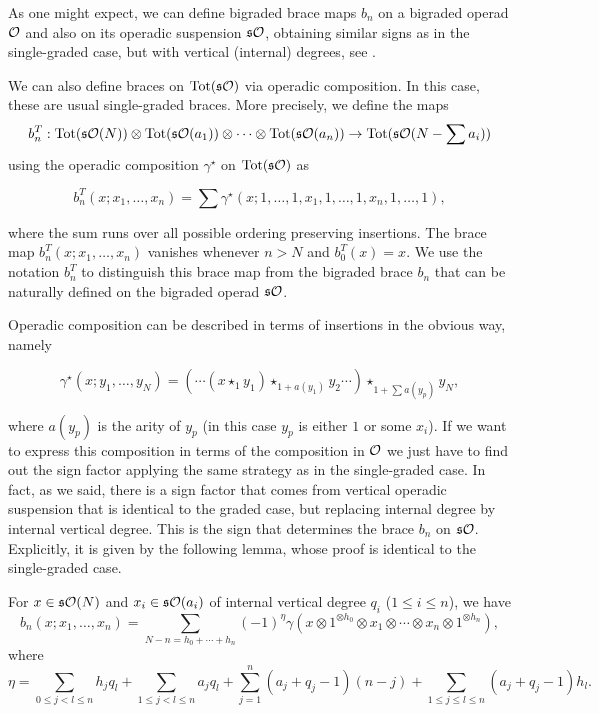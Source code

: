 \documentclass[Thesis.tex]{subfiles}
\begin{document}
As one might expect, we can define bigraded brace maps $b_n$ on a bigraded operad ${\mathcal O}$ and also on its operadic suspension $\mathfrak{s}{\mathcal O}$, obtaining similar signs as in the single-graded case, but with vertical (internal) degrees, see . 

We can also define braces on $\operatorname{Tot}(\mathfrak{s}{\mathcal O})$ via operadic composition. In this case, these are usual single-graded braces. More precisely, we define the maps 
\[b^T_n:\operatorname{Tot}(\mathfrak{s}{\mathcal O}(N))\otimes \operatorname{Tot}(\mathfrak{s}{\mathcal O}(a_1))\otimes\cdots\otimes \operatorname{Tot}(\mathfrak{s}{\mathcal O}(a_n))\to \operatorname{Tot}(\mathfrak{s}{\mathcal O}(N-\sum a_i))\]
using the operadic composition $\gamma^\star$ on $\operatorname{Tot}(\mathfrak{s}{\mathcal O})$ as

\[b^T_n(x;x_1,\dots,x_n)=\sum\gamma^\star(x;1,\dots,1,x_1,1,\dots,1,x_n,1,\dots,1),\]

where the sum runs over all possible ordering preserving insertions. The brace map $b^T_n(x;x_1,\dots,x_n)$ vanishes whenever $n>N$ and $b^T_0(x)=x$. We use the notation $b^T_n$ to distinguish this brace map from the bigraded brace $b_n$ that can be naturally defined on the bigraded operad $\mathfrak{s}{\mathcal O}$.

Operadic composition can be described in terms of insertions in the obvious way, namely 

\begin{equation}\label{gammastar}
\gamma^\star(x;y_1,\dots,y_N)=(\cdots(x\star_1 y_1)\star_{1+a(y_1)}y_2\cdots)\star_{1+\sum a(y_p)}y_N,
\end{equation}

where $a(y_p)$ is the arity of $y_p$ (in this case $y_p$ is either $1$ or some $x_i$). If we want to express this composition in terms of the composition in ${\mathcal O}$ we just have to find out the sign factor applying the same strategy as in the single-graded case. In fact, as we said, there is a sign factor that comes from vertical operadic suspension that is identical to the graded case, but replacing internal degree by internal vertical degree. This is the sign that determines the brace $b_n$ on $\mathfrak{s}{\mathcal O}$. Explicitly, it is given by the following lemma, whose proof is identical to the single-graded case.


 
 \begin{lem}\label{bigradedsign}
For $x\in \mathfrak{s}{\mathcal O}(N)$ and $x_i\in\mathfrak{s}{\mathcal O}(a_i)$ of internal vertical degree $q_i$ ($1\leq i\leq n$), we have
\[b_n(x;x_1,\dots,x_n)=\sum_{N-n=h_0+\cdots+h_n} (-1)^\eta \gamma
(x\otimes 1^{\otimes h_0}\otimes x_1\otimes \cdots\otimes x_n\otimes1^{\otimes h_n}),\]
where 
\[\eta=\sum_{0\leq j<l\leq n}h_jq_l+\sum_{1\leq j<l\leq n}a_jq_l+\sum_{j=1}^n (a_j+q_j-1)(n-j)+\sum_{1\leq j\leq l\leq n} (a_j+q_j-1)h_l.\]
\end{lem}
\end{document}
